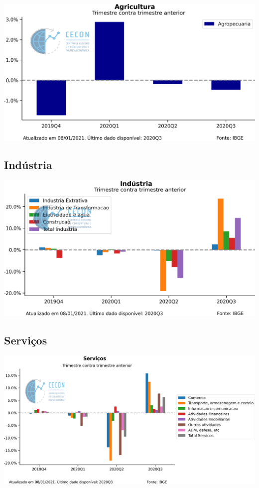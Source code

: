 \documentclass{SelfArx}
\begin{document}
\begin{center}
\includegraphics[width=.9\linewidth]{./figs/PIB/Agropecuaria.png}
\end{center}

\subsection*{Indústria}
\label{sec:org7d5ec00}

\begin{center}
\includegraphics[width=.9\linewidth]{./figs/PIB/Industria.png}
\end{center}


\subsection*{Serviços}
\label{sec:org759fe0d}

\begin{center}
\includegraphics[width=.9\linewidth]{./figs/PIB/Servicos.png}
\end{center}
\end{document}
